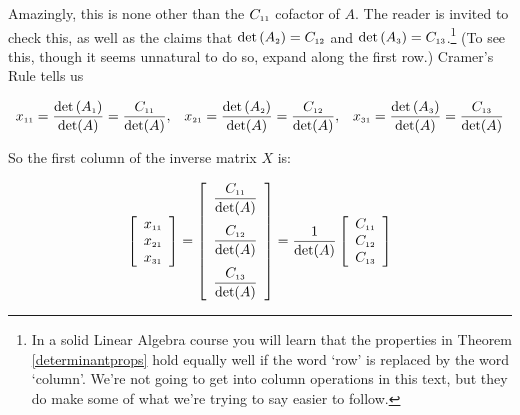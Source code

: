 Amazingly, this is none other than the  $C_{\mbox{\tiny$11$}}$ cofactor of $A$.  The reader is invited to check this, as well as the claims that  $\det\left(A_{\mbox{\tiny$2$}}\right) = C_{\mbox{\tiny$12$}}$ and $\det\left(A_{\mbox{\tiny$3$}}\right) = C_{\mbox{\tiny$13$}}$.\footnote{In a solid Linear Algebra course you will learn that the properties in Theorem \ref{determinantprops} hold equally well if the word `row' is replaced by the word `column'.  We're not going to get into column operations in this text, but they do make some of what we're trying to say easier to follow.} (To see this, though it seems unnatural to do so, expand along the first row.) Cramer's Rule tells us

\[\begin{array}{ccc}

x_{\mbox{\tiny$11$}} = \dfrac{\det\left(A_{\mbox{\tiny$1$}}\right)}{\det(A)} = \dfrac{C_{\mbox{\tiny$11$}}}{\det(A)}, 
&
x_{\mbox{\tiny$21$}} = \dfrac{\det\left(A_{\mbox{\tiny$2$}}\right)}{\det(A)}  = \dfrac{C_{\mbox{\tiny$12$}}}{\det(A)}, 
&
 x_{\mbox{\tiny$31$}} = \dfrac{\det\left(A_{\mbox{\tiny$3$}}\right)}{\det(A)} = \dfrac{C_{\mbox{\tiny$13$}}}{\det(A)}


\end{array} \]

So the first column of the inverse matrix $X$ is:

\[  \left[ \begin{array}{r} x_{\mbox{\tiny$11$}} \\ x_{\mbox{\tiny$21$}} \\ x_{\mbox{\tiny$31$}} \end{array} \right] = \left[ \begin{array}{r} \dfrac{C_{\mbox{\tiny$11$}}}{\det(A)} \\ [13pt]  \dfrac{C_{\mbox{\tiny$12$}}}{\det(A)} \\  [13pt] \dfrac{C_{\mbox{\tiny$13$}}}{\det(A)} \end{array} \right] = \dfrac{1}{\det(A)} \left[ \begin{array}{r} C_{\mbox{\tiny$11$}} \\ C_{\mbox{\tiny$12$}} \\ C_{\mbox{\tiny$13$}} \end{array} \right]  \]

